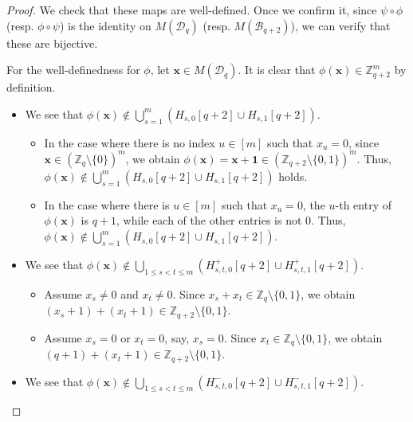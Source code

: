 \documentclass{article}
\theoremstyle{plain}
\theoremstyle{definition}
\theoremstyle{remark}
\numberwithin{equation}{section}
\newcommand{\Bc}{\mathcal{B}}
\newcommand{\Dc}{\mathcal{D}}
\newcommand{\ZZ}{\mathbb{Z}}
\begin{document}
\begin{proof}
We check that these maps are well-defined. Once we confirm it, since $\psi \circ \phi$ (resp. $\phi \circ \psi$) is the identity on $M(\Dc_q)$ (resp. $M(\Bc_{q+2})$), we can verify that these are bijective. 

\medskip

\noindent
For the well-definedness for $\phi$, let $\bm{x} \in M(\Dc_q)$.
It is clear that $\phi(\bm{x}) \in \ZZ_{q+2}^m$ by definition. 
\begin{itemize}
\item We see that $\phi(\bm{x}) \notin \bigcup_{s=1}^m (H_{s,0}[q+2] \cup H_{s,1}[q+2])$. 
    \begin{itemize}
        \item In the case where there is no index $u \in [m]$ such that $x_u = 0$, since $\bm{x} \in (\ZZ_q \setminus \{0\})^m$, we obtain $\phi(\bm{x}) = \bm{x} + \bm{1} \in (\ZZ_{q+2} \setminus \{0,1\})^m$. Thus, $\phi(\bm{x}) \notin \bigcup_{s=1}^m (H_{s,0}[q+2] \cup H_{s,1}[q+2])$ holds.
        \item In the case where there is $u \in [m]$ such that $x_u = 0$, the $u$-th entry of $\phi(\bm{x})$ is $q+1$, while each of the other entries is not $0$. Thus, $\phi(\bm{x}) \notin \bigcup_{s=1}^m (H_{s,0}[q+2] \cup H_{s,1}[q+2])$. 
    \end{itemize}
\item We see that $\phi(\bm{x}) \notin \bigcup_{1 \leq s<t \leq m}(H_{s,t,0}^+[q+2] \cup H_{s,t,1}^+[q+2])$.
    \begin{itemize}
        \item Assume $x_s \neq 0$ and $x_t \neq 0$. Since $x_s + x_t \in \ZZ_q \setminus \{0,1\}$, we obtain $(x_s + 1) + (x_t + 1) \in \ZZ_{q+2} \setminus \{0,1\}$. 
        \item Assume $x_s=0$ or $x_t=0$, say, $x_s=0$. Since $x_t \in \ZZ_q \setminus \{0,1\}$, we obtain $(q+1) + (x_t+1) \in \ZZ_{q+2}\setminus\{0,1\}$. 
    \end{itemize}
\item We see that $\phi(\bm{x}) \notin \bigcup_{1 \leq s<t \leq m}(H_{s,t,0}^-[q+2] \cup H_{s,t,1}^-[q+2])$.

\end{itemize}
\end{proof}
\end{document}
